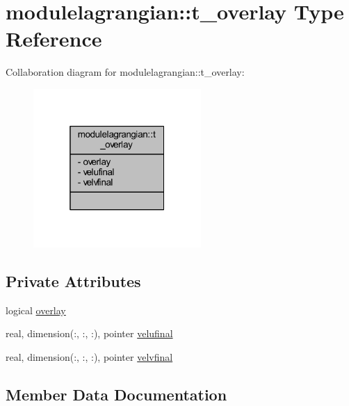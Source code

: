 \hypertarget{structmodulelagrangian_1_1t__overlay}{}\section{modulelagrangian\+:\+:t\+\_\+overlay Type Reference}
\label{structmodulelagrangian_1_1t__overlay}


Collaboration diagram for modulelagrangian\+:\+:t\+\_\+overlay\+:\nopagebreak
\begin{figure}[H]
\begin{center}
\leavevmode
\includegraphics[width=181pt]{structmodulelagrangian_1_1t__overlay__coll__graph}
\end{center}
\end{figure}
\subsection*{Private Attributes}
\begin{DoxyCompactItemize}
\item 
logical \mbox{\hyperlink{structmodulelagrangian_1_1t__overlay_a4e30d779cabe3f3a93657fda780825e1}{overlay}}
\item 
real, dimension(\+:, \+:, \+:), pointer \mbox{\hyperlink{structmodulelagrangian_1_1t__overlay_a9001e11332910b40392150e49a9c6c65}{velufinal}}
\item 
real, dimension(\+:, \+:, \+:), pointer \mbox{\hyperlink{structmodulelagrangian_1_1t__overlay_a7c811a715c51c5700309be6a4576e121}{velvfinal}}
\end{DoxyCompactItemize}


\subsection{Member Data Documentation}
\mbox{\label{structmodulelagrangian_1_1t__overlay_a4e30d779cabe3f3a93657fda780825e1}} 
